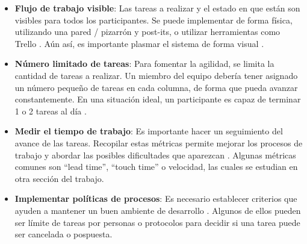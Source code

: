 \begin{itemize}
    \item \textbf{Flujo de trabajo visible}: Las tareas a realizar y el estado en que están son visibles para todos los participantes. Se puede implementar de forma física, utilizando una pared / pizarrón y post-its, o utilizar herramientas como Trello \cite{CaptureOrganizeTackle}. Aún así, es importante plasmar el sistema de forma visual \cite{montegalianoImplantarScrumCon2016,canosaferreiroSCRUMTeoriaImplementacion2024}.
    \item \textbf{Número limitado de tareas}: Para fomentar la agilidad, se limita la cantidad de tareas a realizar. Un miembro del equipo debería tener asignado un número pequeño de tareas en cada columna, de forma que pueda avanzar constantemente. En una situación ideal, un participante es capaz de terminar 1 o 2 tareas al día \cite{montegalianoImplantarScrumCon2016,canosaferreiroSCRUMTeoriaImplementacion2024}.
    \item \textbf{Medir el tiempo de trabajo}: Es importante hacer un seguimiento del avance de las tareas. Recopilar estas métricas permite mejorar los procesos de trabajo y abordar las posibles dificultades que aparezcan  \cite{montegalianoImplantarScrumCon2016,canosaferreiroSCRUMTeoriaImplementacion2024}. Algunas métricas comunes son “lead time”, “touch time” o velocidad, las cuales se estudian en otra sección del trabajo. 
    \item \textbf{Implementar políticas de procesos}: Es necesario establecer criterios que ayuden a mantener un buen ambiente de desarrollo \cite{canosaferreiroSCRUMTeoriaImplementacion2024}. Algunos de ellos pueden ser límite de tareas por personas o protocolos para decidir si una tarea puede ser cancelada o pospuesta. 
\end{itemize}
